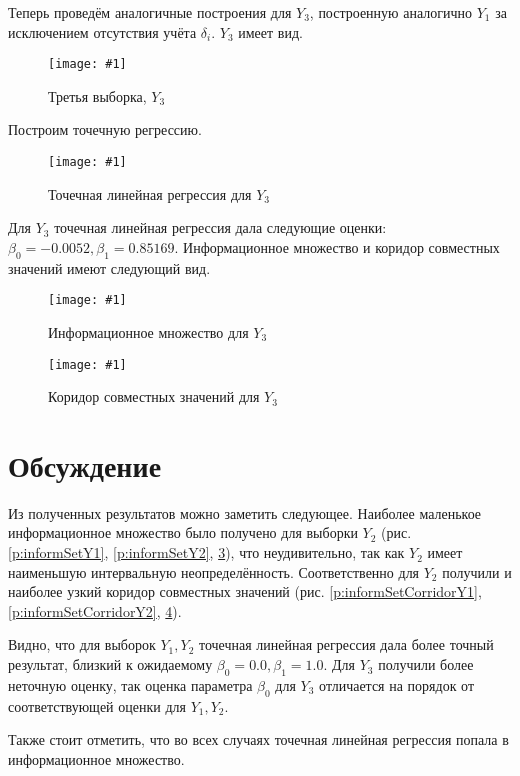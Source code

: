 \documentclass[a4paper,12pt]{article}
\newcommand{\plot}[3]{
    \begin{figure}[H]
        \begin{center}
            \texttt{[image: \#1]}
            \caption{#2}
            \label{#3}
        \end{center}
    \end{figure}
}
\begin{document}
    Теперь проведём аналогичные построения для $ Y_3 $, построенную аналогично $ Y_1 $
    за исключением отсутствия учёта $ \delta_i $.
    $ Y_3 $ имеет вид.
    \plot{Y3}{Третья выборка, $ Y_3 $}{p:sampleY3}

    Построим точечную регрессию.
    \plot{PointRegressionY3}{Точечная линейная регрессия для $ Y_3 $}{p:regressionY3}

    Для $ Y_3 $ точечная линейная регрессия дала следующие оценки: $ \beta_0 = -0.0052, \beta_1 = 0.85169 $.
    Информационное множество и коридор совместных значений имеют следующий вид.

    \plot{InformSetY3}{Информационное множество для $ Y_3 $}{p:informSetY3}
    \plot{informSetCorridorY3}{Коридор совместных значений для $ Y_3 $}{p:informSetCorridorY3}

    \section{Обсуждение}
    \quad Из полученных результатов можно заметить следующее.
    Наиболее маленькое информационное множество было получено для выборки $ Y_2 $
    (рис. \ref{p:informSetY1}, \ref{p:informSetY2}, \ref{p:informSetY3}),
    что неудивительно, так как $ Y_2 $ имеет наименьшую интервальную неопределённость.
    Соответственно для $ Y_2 $ получили и наиболее узкий коридор совместных значений
    (рис. \ref{p:informSetCorridorY1}, \ref{p:informSetCorridorY2}, \ref{p:informSetCorridorY3}).
    
    Видно, что для выборок $ Y_1, Y_2 $ точечная линейная регрессия дала более точный результат,
    близкий к ожидаемому $ \beta_0 = 0.0, \beta_1 = 1.0 $. Для $ Y_3 $ получили более неточную оценку,
    так оценка параметра $ \beta_0 $ для $ Y_3 $ отличается на порядок от соответствующей оценки для $ Y_1, Y_2 $.

    Также стоит отметить, что во всех случаях точечная линейная регрессия попала в информационное множество.
\end{document}
